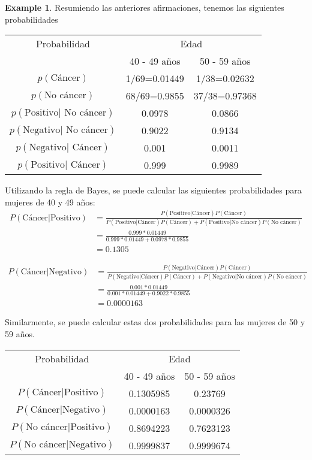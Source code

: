 \documentclass[
  spanish,
  letter]{book}
\theoremstyle{definition}
\theoremstyle{definition}
\newtheorem{example}{Example}[chapter]
\theoremstyle{definition}
\theoremstyle{remark}
\begin{document}
\begin{example}
Resumiendo las anteriores afirmaciones, tenemos las siguientes probabilidades

\begin{table}[!h]
\centering
  \begin{tabular}{|c|c|c|}\hline
  Probabilidad&\multicolumn{2}{|c|}{Edad}\\\cline{2-3}
  &40 - 49 años&50 - 59 años\\\hline
  $p(\text{Cáncer})$&1/69=0.01449&1/38=0.02632\\
  $p(\text{No cáncer})$&68/69=0.9855&37/38=0.97368\\
  $p(\text{Positivo}|\text{ No cáncer})$&0.0978&0.0866\\
  $p(\text{Negativo}|\text{ No cáncer})$&0.9022&0.9134\\
  $p(\text{Negativo}|\text{ Cáncer})$&0.001&0.0011\\
  $p(\text{Positivo}|\text{ Cáncer})$&0.999&0.9989\\\hline
  \end{tabular}
\end{table}

Utilizando la regla de Bayes, se puede calcular las siguientes probabilidades para mujeres de 40 y 49 años:
\begin{align*}
P(\text{Cáncer}|\text{Positivo})&=\frac{P(\text{Positivo}|\text{Cáncer})P(\text{Cáncer})}{P(\text{Positivo}|\text{Cáncer})P(\text{Cáncer})+P(\text{Positivo}|\text{No cáncer})P(\text{No cáncer})}\\
&=\frac{0.999*0.01449}{0.999*0.01449+0.0978*0.9855}\\
&=0.1305
\end{align*}

\begin{align*}
P(\text{Cáncer}|\text{Negativo})&=\frac{P(\text{Negativo}|\text{Cáncer})P(\text{Cáncer})}{P(\text{Negativo}|\text{Cáncer})P(\text{Cáncer})+P(\text{Negativo}|\text{No cáncer})P(\text{No cáncer})}\\
&=\frac{0.001*0.01449}{0.001*0.01449+0.9022*0.9855}\\
&=0.0000163
\end{align*}

Similarmente, se puede calcular estas dos probabilidades para las mujeres de 50 y 59 años.

\begin{table}[!h]
\centering
  \begin{tabular}{|c|c|c|}\hline
  Probabilidad&\multicolumn{2}{|c|}{Edad}\\\cline{2-3}
  &40 - 49 años&50 - 59 años\\\hline
  $P(\text{Cáncer}|\text{Positivo})$&0.1305985&0.23769\\
  $P(\text{Cáncer}|\text{Negativo})$&0.0000163&0.0000326\\
  $P(\text{No cáncer}|\text{Positivo})$&0.8694223&0.7623123\\
  $P(\text{No cáncer}|\text{Negativo})$&0.9999837&0.9999674\\\hline
  \end{tabular}
\end{table}


\end{example}
\end{document}
